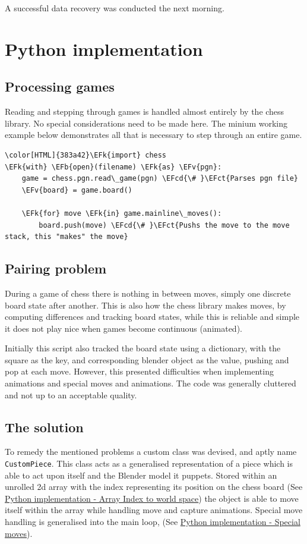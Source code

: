 \documentclass[11pt]{article}
\newcommand{\EFk}[1]{\textcolor{EFk}{#1}} %
\newcommand{\EFb}[1]{\textcolor{EFb}{#1}} %
\newcommand{\EFct}[1]{\textcolor{EFct}{#1}} %
\newcommand{\EFv}[1]{\textcolor{EFv}{#1}} %
\newcommand{\EFcd}[1]{\textcolor{EFcd}{#1}} %
\begin{document}
A successful data recovery was conducted the next morning.
\section{Python implementation}
\label{sec:org635c080}
\subsection{Processing games}
\label{sec:org8d0c0bb}
Reading and stepping through games is handled almost entirely by the chess
library. No special considerations need to be made here. The minium working
example below demonstrates all that is necessary to step through an entire game.

\begin{Code}
\begin{Verbatim}[]
\color[HTML]{383a42}\EFk{import} chess
\EFk{with} \EFb{open}(filename) \EFk{as} \EFv{pgn}:
    game = chess.pgn.read\_game(pgn) \EFcd{\# }\EFct{Parses pgn file}
    \EFv{board} = game.board()

    \EFk{for} move \EFk{in} game.mainline\_moves():
        board.push(move) \EFcd{\# }\EFct{Pushs the move to the move stack, this "makes" the move}
\end{Verbatim}
\end{Code}
\subsection{Pairing problem}
\label{sec:org7ffc277}
During a game of chess there is nothing in between moves, simply one discrete
board state after another. This is also how the chess library makes moves, by
computing differences and tracking board states, while this is reliable and
simple it does not play nice when games become continuous (animated).

Initially this script also tracked the board state using a dictionary, with the
square as the key, and corresponding blender object as the value, pushing and
pop at each move. However, this presented difficulties when implementing
animations and special moves and animations. The code was generally cluttered
and not up to an acceptable quality.
\subsection{The solution}
\label{sec:org7dac770}
To remedy the mentioned problems a custom class was devised, and aptly name
\texttt{CustomPiece}. This class acts as a generalised representation of a piece which
is able to act upon itself and the Blender model it puppets. Stored within an
unrolled 2d array with the index representing its position on the chess board
(See \hyperref[sec:org83e8bbd]{Python implementation - Array Index to world space}) the object is able to
move itself within the array while handling move and capture animations. Special
move handling is generalised into the main loop, (See \hyperref[sec:orgbc2a84b]{Python implementation -
Special moves}).
\end{document}
